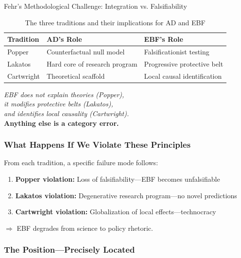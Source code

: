 \begin{chapter}{Fehr's Methodological Challenge: Integration vs. Falsifiability}
\begin{table}[h!]
\centering
\begin{tabular}{p{}|p{}|p{}}
\toprule
\textbf{Tradition} & \textbf{AD's Role} & \textbf{EBF's Role} \\
\midrule
Popper & Counterfactual null model & Falsificationist testing \\
\midrule
Lakatos & Hard core of research program & Progressive protective belt \\
\midrule
Cartwright & Theoretical scaffold & Local causal identification \\
\bottomrule
\end{tabular}
\caption{The three traditions and their implications for AD and EBF}
\end{table}

\begin{tcolorbox}[colback=blue!5!white,colframe=blue!75!black,title=\textbf{The Canonical Formulation (Integrating All Three)}]
\begin{center}
\large
\textit{EBF does not explain theories (Popper),\\
it modifies protective belts (Lakatos),\\
and identifies local causality (Cartwright).}\\[0.5em]
\normalsize
\textbf{Anything else is a category error.}
\end{center}
\end{tcolorbox}

\subsubsection{What Happens If We Violate These Principles}

From each tradition, a specific failure mode follows:

\begin{enumerate}
    \item \textbf{Popper violation:} Loss of falsifiability---EBF becomes unfalsifiable
    \item \textbf{Lakatos violation:} Degenerative research program---no novel predictions
    \item \textbf{Cartwright violation:} Globalization of local effects---technocracy
\end{enumerate}

$\Rightarrow$ EBF degrades from science to policy rhetoric.

\subsubsection{The Position---Precisely Located}


\end{chapter}
